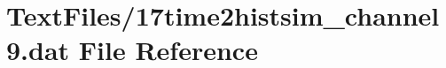 \hypertarget{17time2histsim__channel9_8dat}{}\section{Text\+Files/17time2histsim\+\_\+channel9.dat File Reference}
\label{17time2histsim__channel9_8dat}
